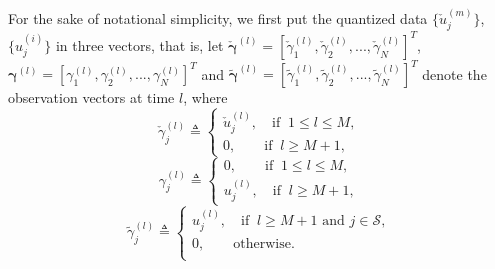 \documentclass[11pt, draftclsnofoot, onecolumn]{IEEEtran}
\newcommand{\cS}{\mathcal{S}}
\newcommand{\bgamma}{{\boldsymbol{\gamma}}}
\newcommand{\cbgamma}{{\check{\boldsymbol{\gamma}}}}
\newcommand{\cgamma}{{\check{{\gamma}}}}
\newcommand{\tbgamma}{{\widetilde{\boldsymbol{\gamma}}}}
\newcommand{\tgamma}{{\widetilde{{\gamma}}}}
\newcommand{\cu}{{\check{u}}}
\begin{document}
For the sake of notational simplicity, we first put the quantized data $\{\cu_j^{(m)}\}$, $\{u_j^{(i)}\}$ in three vectors, that is, let $\cbgamma^{(l)}= {[\cgamma _1^{(l)},\cgamma _2^{(l)},...,\cgamma _N^{(l)}]^T}$,  $\bgamma^{(l)} = {[\gamma _1^{(l)},\gamma _2^{(l)},...,\gamma _N^{(l)}]^T}$  and $\tbgamma^{(l)} = {[\tgamma _1^{(l)},\tgamma _2^{(l)},...,\tgamma _N^{(l)}]^T}$ denote the observation vectors at time $l$, where
\begin{equation} \label{cgamma_define}
\cgamma _j^{(l)} \triangleq \left\{ \begin{array}{l}
\cu_j^{(l)}, \quad \text{if} \;\; 1 \le l \le M,\\
0,\qquad \text{if} \;\; l \ge M+1,
\end{array} \right.
\end{equation}
\begin{equation} \label{gamma_define}
\gamma _j^{(l)} \triangleq \left\{ \begin{array}{l}
0, \qquad \text{if} \;\; 1 \le l \le M,\\
u_j^{(l)}, \quad \text{if} \;\; l \ge M+1,
\end{array} \right.
\end{equation}
\begin{equation} \label{tgamma_define}
\tgamma _j^{(l)} \triangleq \left\{ \begin{array}{l}
u_j^{(l)}, \quad \text{if} \;\; l \ge M+1 \text{ and } j \in \cS, \\
0, \qquad \text{otherwise}.\\
\end{array} \right.
\end{equation}
\end{document}

